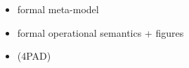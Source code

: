 \begin{itemize}
\item formal meta-model
\item formal operational semantics + figures
\item (4PAD)
\end{itemize}

